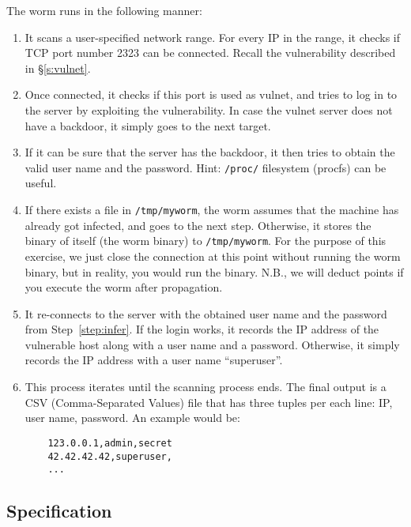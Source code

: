 \documentclass[a4paper, 11pt]{article}
\theoremstyle{definition}
\begin{document}
{The worm runs in the following manner:

\begin{enumerate}

  \item It scans a user-specified network range. For every IP in the
    range, it checks if TCP port number 2323 can be connected. Recall
    the vulnerability described in \S\ref{s:vulnet}.

  \item Once connected, it checks if this port is used as vulnet, and
    tries to log in to the server by exploiting the vulnerability. In
    case the vulnet server does not have a backdoor, it simply goes to
    the next target.

  \item If it can be sure that the server has the backdoor, it then
    tries to obtain the valid user name and the password. Hint:
    \texttt{/proc/} filesystem (procfs) can be useful.
    \label{step:infer}

  \item If there exists a file in \texttt{/tmp/myworm}, the worm
    assumes that the machine has already got infected, and goes to the
    next step. Otherwise, it stores the binary of itself (the worm
    binary) to \texttt{/tmp/myworm}. For the purpose of this exercise,
    we just close the connection at this point without running the
    worm binary, but in reality, you would run the binary. N.B., we
    will deduct points if you execute the worm after propagation.

  \item It re-connects to the server with the obtained user name and
    the password from Step~\ref{step:infer}. If the login works, it
    records the IP address of the vulnerable host along with a user
    name and a password. Otherwise, it simply records the IP address
    with a user name ``superuser''.

  \item This process iterates until the scanning process ends. The
    final output is a CSV (Comma-Separated Values) file that has three
    tuples per each line: IP, user name, password. An example would
    be:
    \begin{verbatim}
    123.0.0.1,admin,secret
    42.42.42.42,superuser,
    ...
    \end{verbatim}

\end{enumerate}

\subsection{Specification}

}
\end{document}
